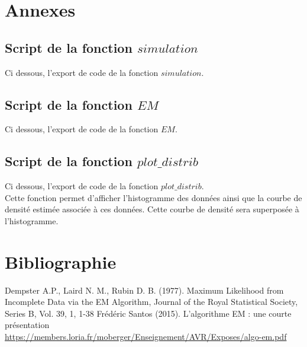 \documentclass[a4paper,french,10pt]{article}
\begin{document}
\section{Annexes}
\subsection{Script de la fonction $simulation$}
Ci dessous, l'export de code de la fonction $simulation$.


\newpage

\subsection{Script de la fonction $EM$}
Ci dessous, l'export de code de la fonction $EM$.


\newpage

\subsection{Script de la fonction $plot\_distrib$}
Ci dessous, l'export de code de la fonction $plot\_distrib$. \\
Cette fonction permet d'afficher l'histogramme des données ainsi que la courbe de densité estimée associée à ces données. Cette courbe de densité sera superposée à l'histogramme.


\newpage

\section{Bibliographie}

\renewcommand\refname{}
\begin{thebibliography}{9}
	Dempster A.P., Laird N. M., Rubin D. B. (1977). Maximum Likelihood from Incomplete Data via the EM Algorithm, Journal of the Royal Statistical Society, Series B, Vol. 39, 1, 1-38
	Frédéric Santos (2015). L'algorithme EM : une courte présentation
	\url{https://members.loria.fr/moberger/Enseignement/AVR/Exposes/algo-em.pdf}
\end{thebibliography}
\end{document}
